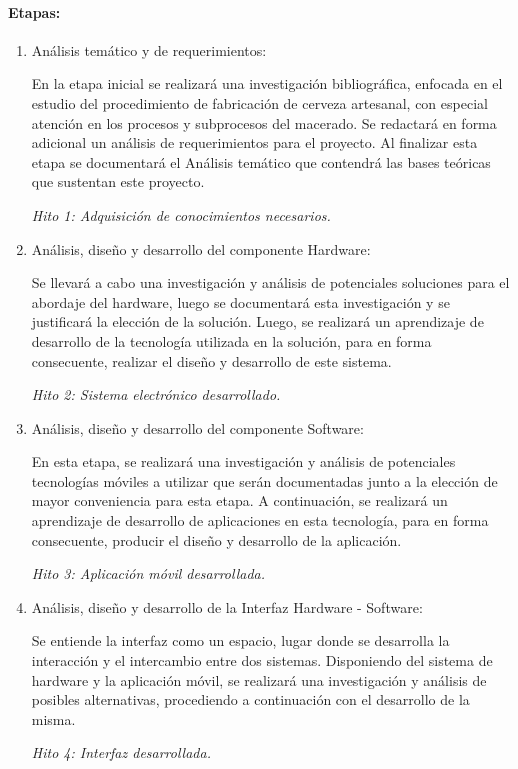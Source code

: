     \paragraph{Etapas:}
        \begin{enumerate}
            \item Análisis temático y de requerimientos:
                \par En la etapa inicial se realizará una investigación bibliográfica, enfocada en el estudio del procedimiento de fabricación de cerveza artesanal, con especial atención en los procesos y subprocesos del macerado. Se redactará en forma adicional un análisis de requerimientos para el proyecto. Al finalizar esta etapa se documentará el Análisis temático que contendrá las bases teóricas que sustentan este proyecto.
                \par \textit{Hito 1: Adquisición de conocimientos necesarios.}
                
            \item Análisis, diseño y desarrollo del componente Hardware:
                \par Se llevará a cabo una investigación y análisis de potenciales soluciones para el abordaje del hardware, luego se  documentará esta investigación y se justificará la elección de la solución. Luego, se realizará un aprendizaje de desarrollo de la tecnología utilizada en la solución, para en forma consecuente, realizar el diseño y desarrollo de este sistema.
                \par \textit{Hito 2: Sistema electrónico desarrollado.} 
                
            \item Análisis, diseño y desarrollo del componente Software:
                \par En esta etapa, se realizará una investigación y análisis de potenciales tecnologías móviles a utilizar que serán documentadas junto a la elección de mayor conveniencia para esta etapa. A continuación, se realizará un aprendizaje de desarrollo de aplicaciones en esta tecnología, para en forma consecuente, producir el diseño y desarrollo de la aplicación.
                \par \textit{Hito 3: Aplicación móvil desarrollada.}
                
            \item Análisis, diseño y desarrollo de la Interfaz Hardware - Software:
                \par Se entiende la interfaz como un espacio,  lugar donde se desarrolla la interacción y el intercambio entre dos sistemas. Disponiendo del sistema de hardware y la aplicación móvil, se realizará una investigación y análisis de posibles alternativas, procediendo a continuación con el desarrollo de la misma.
                \par \textit{Hito 4: Interfaz desarrollada.}
                

\end{enumerate}

